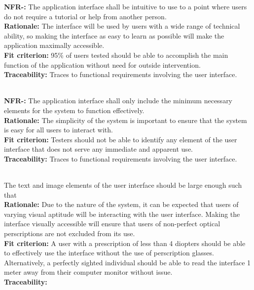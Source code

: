 \documentclass[12pt, titlepage]{article}
\newcounter{NFR_Counter}
\newcounter{FR_Counter}
\begin{document}
\textbf{NFR-\the\value{NFR_Counter}:}
The application interface shall be intuitive to use to a point where users do not require a tutorial or help from another person. \\
\textbf{Rationale:}
The interface will be used by users with a wide range of technical ability, so making the interface as easy to learn as possible will make the application maximally accessible. \\
\textbf{Fit criterion:}
95\% of users tested should be able to accomplish the main function of the application without need for outside intervention. \\
\textbf{Traceability:}
Traces to functional requirements involving the user interface. \\~\\
\addtocounter{NFR_Counter}{1}

\noindent\textbf{NFR-\the\value{NFR_Counter}:}
The application interface shall only include the minimum necessary elements for the system to function effectively. \\
\textbf{Rationale:}
The simplicity of the system is important to ensure that the system is easy for all users to interact with. \\
\textbf{Fit criterion:}
Testers should not be able to identify any element of the user interface that does not serve any immediate and apparent use. \\
\textbf{Traceability:}
Traces to functional requirements involving the user interface. \\~\\
\addtocounter{NFR_Counter}{1}

The text and image elements of the user interface should be large enough such that  \\
\textbf{Rationale:}
Due to the nature of the system, it can be expected that users of varying visual aptitude will be interacting with the user interface. Making the interface visually accessible will ensure that users of non-perfect optical perscriptions are not excluded from its use. \\
\textbf{Fit criterion:}
A user with a prescription of less than 4 diopters should be able to effectively use the interface without the use of perscription glasses. Alternatively, a perfectly sighted individual should be able to read the interface 1 meter away from their computer monitor without issue. \\
\textbf{Traceability:}
 \\~\\
\addtocounter{NFR_Counter}{1}
\end{document}
